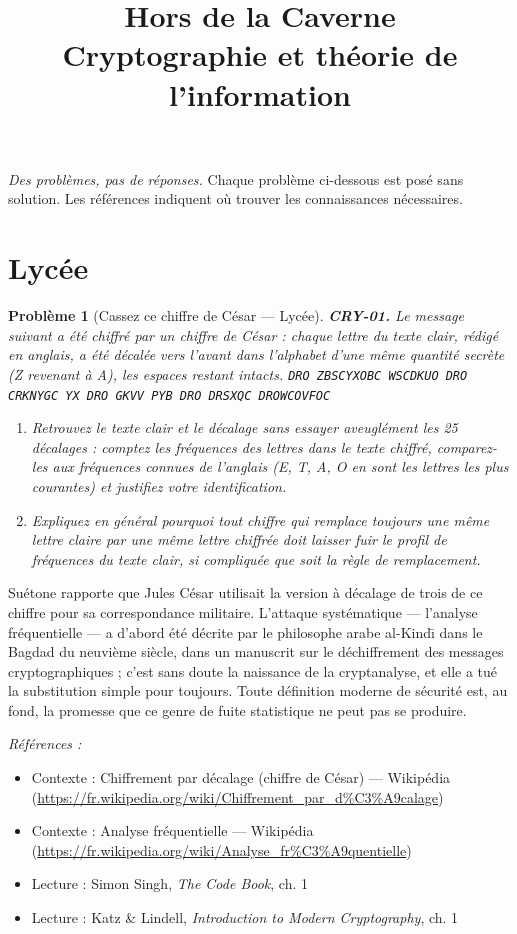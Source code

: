 \documentclass[11pt]{article}
\title{Hors de la Caverne \\ \Large Cryptographie et théorie de l'information}
\author{}
\date{}
\newtheorem{problem}{Problème}
\newenvironment{refs}{\par\small\noindent\emph{Références :}\begin{itemize}\setlength\itemsep{0pt}}{\end{itemize}\normalsize}
\begin{document}
\maketitle
\noindent\emph{Des problèmes, pas de réponses.} Chaque problème ci-dessous est posé
sans solution. Les références indiquent où trouver les connaissances nécessaires.
\medskip


\section*{Lycée}

\begin{problem}[{Cassez ce chiffre de César --- Lycée}]
\textbf{CRY-01.} Le message suivant a été chiffré par un chiffre
de César : chaque lettre du texte clair, rédigé en anglais, a été décalée vers l'avant dans
l'alphabet d'une même quantité secrète (Z revenant à A), les espaces restant intacts.
 \texttt{DRO ZBSCYXOBC WSCDKUO DRO CRKNYGC YX DRO GKVV PYB DRO DRSXQC
DROWCOVFOC}
\begin{enumerate}
\item[(a)] Retrouvez le texte clair et le décalage \textit{sans essayer aveuglément les 25 décalages} :
comptez les fréquences des lettres dans le texte chiffré, comparez-les aux fréquences
connues de l'anglais (E, T, A, O en sont les lettres les plus courantes) et justifiez votre
identification.
\item[(b)] Expliquez en général pourquoi tout chiffre qui remplace toujours une même lettre claire
par une même lettre chiffrée doit laisser fuir le profil de fréquences du texte clair, si
compliquée que soit la règle de remplacement.
\end{enumerate}

\end{problem}

\noindent Suétone rapporte que Jules César utilisait la version à décalage de trois
de ce chiffre pour sa correspondance militaire. L'attaque systématique --- l'analyse
fréquentielle --- a d'abord été décrite par le philosophe arabe al-Kind\={\i} dans le Bagdad du
neuvième siècle, dans un manuscrit sur le déchiffrement des messages cryptographiques ;
c'est sans doute la naissance de la cryptanalyse, et elle a tué la substitution simple pour
toujours. Toute définition moderne de sécurité est, au fond, la promesse que ce genre de
fuite statistique ne peut pas se produire.

\begin{refs}
\item Contexte : Chiffrement par décalage (chiffre de César) --- Wikipédia (\url{https://fr.wikipedia.org/wiki/Chiffrement_par_d%C3%A9calage})
\item Contexte : Analyse fréquentielle --- Wikipédia (\url{https://fr.wikipedia.org/wiki/Analyse_fr%C3%A9quentielle})
\item Lecture : Simon Singh, \textit{The Code Book}, ch. 1
\item Lecture : Katz \& Lindell, \textit{Introduction to Modern Cryptography}, ch. 1
\end{refs}
\end{document}
